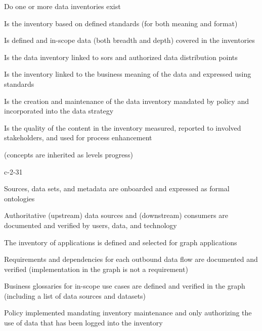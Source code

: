 %
%



\begin{maturity-dimensions}

  \item Do one or more data inventories exist
  \item Is the inventory based on defined standards (for both meaning and format)
  \item Is defined and in-scope data (both breadth and depth) covered in the inventories
  \item Is the data inventory linked to \glspl{sor} and authorized data distribution points
  \item Is the inventory linked to the business meaning of the data and expressed using standards
  \item Is the creation and maintenance of the data inventory mandated by policy and incorporated
        into the data strategy
  \item Is the quality of the content in the inventory measured, reported to involved stakeholders,
        and used for process enhancement

\end{maturity-dimensions}

\ekgmmCapabilitySectionLevelsOneFive

(concepts are inherited as levels progress)

\begin{level-assessment}{c-2-3}{1}

  \item Sources, data sets, and metadata are onboarded and expressed as formal ontologies
  \item Authoritative (upstream) data sources and (downstream) consumers are documented and verified by users,
        data, and technology
  \item The inventory of applications is defined and selected for graph applications
  \item Requirements and dependencies for each outbound data flow are documented and verified (implementation in the
        graph is not a requirement)
  \item Business glossaries for in-scope use cases are defined and verified in the graph (including a list of
        data sources and datasets)
  \item Policy implemented mandating inventory maintenance and only authorizing the use of data that has been logged
        into the inventory

\end{level-assessment}

